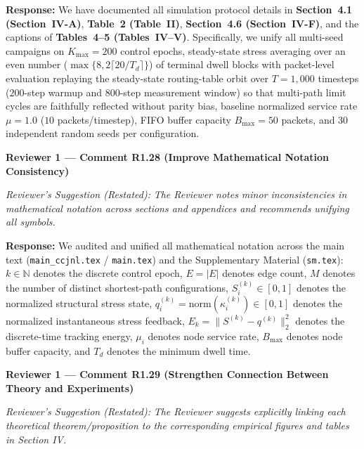 \documentclass[11pt,a4paper]{article}
\newcommand{\cbox}[2]{%
  \vspace{0.6em}\noindent\textbf{#1}\par\smallskip
  \noindent\textit{Reviewer's Suggestion (Restated):} \textit{#2}\par\smallskip
}
\begin{document}
\noindent\textbf{Response:} We have documented all simulation protocol details in \textbf{Section~4.1 (Section~IV-A)}, \textbf{Table~2 (Table~II)}, \textbf{Section~4.6 (Section~IV-F)}, and the captions of \textbf{Tables~4--5 (Tables~IV--V)}. Specifically, we unify all multi-seed campaigns on $K_{\max}=200$ control epochs, steady-state stress averaging over an even number ($\max\{8, 2\lceil 20/T_d\rceil\}$) of terminal dwell blocks with packet-level evaluation replaying the steady-state routing-table orbit over $T=1{,}000$ timesteps ($200$-step warmup and $800$-step measurement window) so that multi-path limit cycles are faithfully reflected without parity bias, baseline normalized service rate $\mu = 1.0$ ($10$ packets/timestep), FIFO buffer capacity $B_{\max} = 50$ packets, and 30 independent random seeds per configuration.

\hrulefill

\cbox{Reviewer 1 --- Comment R1.28 (Improve Mathematical Notation Consistency)}{The Reviewer notes minor inconsistencies in mathematical notation across sections and appendices and recommends unifying all symbols.}

\noindent\textbf{Response:} We audited and unified all mathematical notation across the main text (\texttt{main\_ccjnl.tex} / \texttt{main.tex}) and the Supplementary Material (\texttt{sm.tex}): $k \in \mathbb{N}$ denotes the discrete control epoch, $E = |E|$ denotes edge count, $M$ denotes the number of distinct shortest-path configurations, $S_i^{(k)} \in [0,1]$ denotes the normalized structural stress state, $q_i^{(k)} = \mathrm{norm}(\kappa_i^{(k)}) \in [0,1]$ denotes the normalized instantaneous stress feedback, $E_k = \|S^{(k)}-q^{(k)}\|_2^2$ denotes the discrete-time tracking energy, $\mu_i$ denotes node service rate, $B_{\max}$ denotes node buffer capacity, and $T_d$ denotes the minimum dwell time.

\hrulefill

\cbox{Reviewer 1 --- Comment R1.29 (Strengthen Connection Between Theory and Experiments)}{The Reviewer suggests explicitly linking each theoretical theorem/proposition to the corresponding empirical figures and tables in Section IV.}
\end{document}
